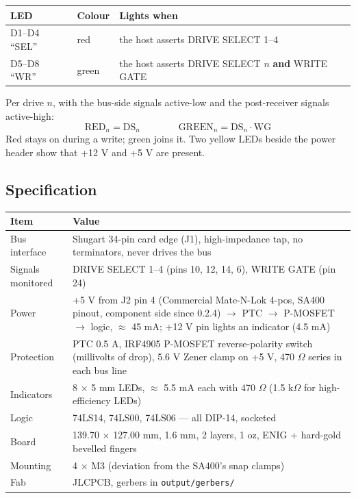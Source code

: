 \documentclass[11pt,a4paper]{article}
\begin{document}
\begin{center}
\begin{tabular}{@{}lll@{}}
\toprule
LED & Colour & Lights when\\
\midrule
D1--D4 ``SEL'' & red & the host asserts DRIVE SELECT 1--4\\
D5--D8 ``WR'' & green & the host asserts DRIVE SELECT $n$ \textbf{and} WRITE GATE\\
\bottomrule
\end{tabular}
\end{center}

Per drive $n$, with the bus-side signals active-low and the post-receiver signals active-high:
\[
\mathrm{RED}_n = \mathrm{DS}_n \qquad\qquad \mathrm{GREEN}_n = \mathrm{DS}_n \cdot \mathrm{WG}
\]
Red stays on during a write; green joins it. Two yellow LEDs beside the power header show that +12 V and
+5 V are present.

\subsection{Specification}
\begin{center}
\begin{tabular}{@{}p{45mm}p{115mm}@{}}
\toprule
Item & Value\\
\midrule
Bus interface & Shugart 34-pin card edge (J1), high-impedance tap, no terminators, never drives the bus\\
Signals monitored & DRIVE SELECT 1--4 (pins 10, 12, 14, 6), WRITE GATE (pin 24)\\
Power & +5 V from J2 pin 4 (Commercial Mate-N-Lok 4-pos, SA400 pinout, component side since 0.2.4) $\to$ PTC $\to$ P-MOSFET $\to$ logic, $\approx$ 45 mA; +12 V pin lights an indicator (4.5 mA)\\
Protection & PTC 0.5 A, IRF4905 P-MOSFET reverse-polarity switch (millivolts of drop), 5.6 V Zener clamp on +5 V, 470 $\Omega$ series in each bus line\\
Indicators & 8 $\times$ 5 mm LEDs, $\approx$ 5.5 mA each with 470 $\Omega$ (1.5 k$\Omega$ for high-efficiency LEDs)\\
Logic & 74LS14, 74LS00, 74LS06 --- all DIP-14, socketed\\
Board & 139.70 $\times$ 127.00 mm, 1.6 mm, 2 layers, 1 oz, ENIG + hard-gold bevelled fingers\\
Mounting & 4 $\times$ M3 (deviation from the SA400's snap clamps)\\
Fab & JLCPCB, gerbers in \texttt{output/gerbers/}\\
\bottomrule
\end{tabular}
\end{center}
\end{document}

